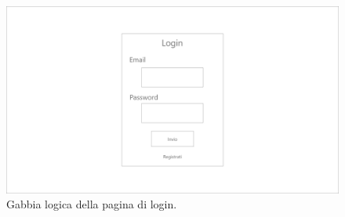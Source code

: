 
\begin{figure}[H]
	\centering
	\caption{Gabbia logica della pagina di login.}
	\label{fig:gabbie-logiche:login}
	\includegraphics[width=\textwidth]{images/gabbie-logiche/Login}
\end{figure}

